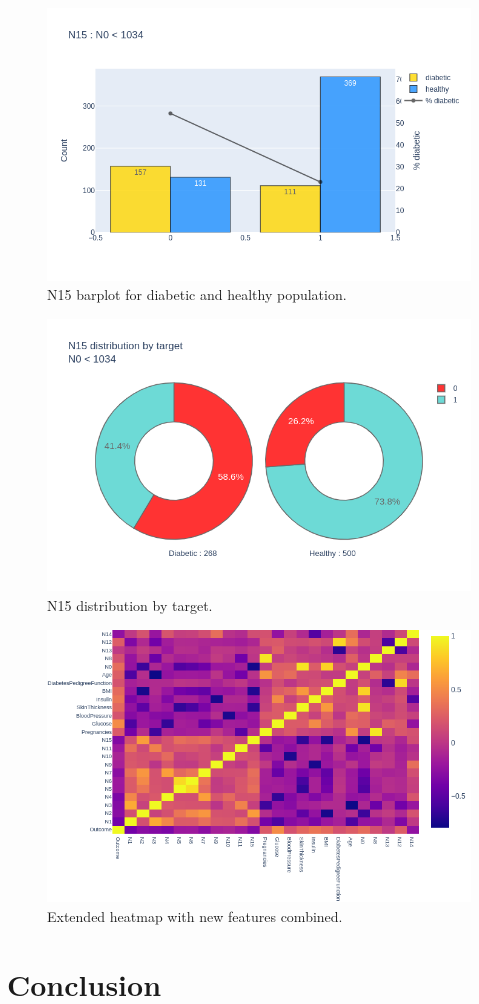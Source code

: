 \documentclass[12pt]{article}
\begin{document}
\begin{figure}[ht]
\centering
\includegraphics[width=1\textwidth]{newplot(40).png}
\caption{\label{fig:47} N15 barplot for diabetic and healthy population.}
\end{figure}

\begin{figure}[ht]
\centering
\includegraphics[width=1\textwidth]{newplot(41).png}
\caption{\label{fig:48} N15 distribution by target.}
\end{figure}

\begin{figure}[ht]
\centering
\includegraphics[width=1\textwidth]{newplot(42).png}
\caption{\label{fig:49} Extended heatmap with new features combined.}
\end{figure}

\clearpage
\newpage
\section{Conclusion}

\newpage

\nocite{*}
 

\end{document}
